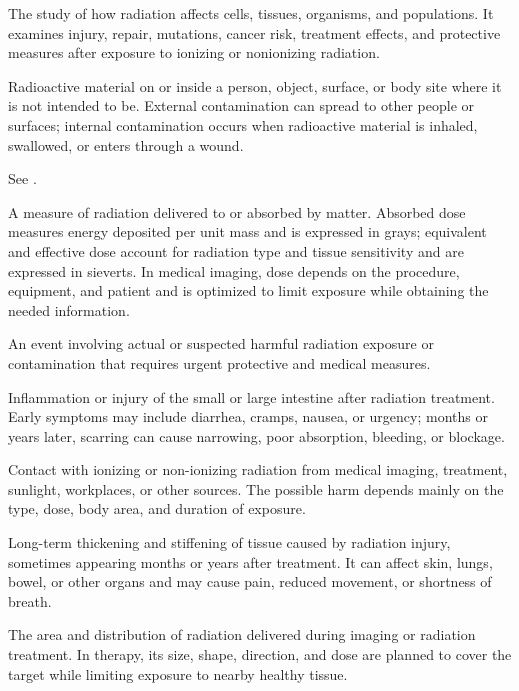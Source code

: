  The study of how radiation affects cells, tissues, organisms, and populations. It examines injury, repair, mutations, cancer risk, treatment effects, and protective measures after exposure to ionizing or nonionizing radiation.

 Radioactive material on or inside a person, object, surface, or body site where it is not intended to be. External contamination can spread to other people or surfaces; internal contamination occurs when radioactive material is inhaled, swallowed, or enters through a wound.

 See .

 A measure of radiation delivered to or absorbed by matter. Absorbed dose measures energy deposited per unit mass and is expressed in grays; equivalent and effective dose account for radiation type and tissue sensitivity and are expressed in sieverts. In medical imaging, dose depends on the procedure, equipment, and patient and is optimized to limit exposure while obtaining the needed information.

 An event involving actual or suspected harmful radiation exposure or contamination that requires urgent protective and medical
measures.

 Inflammation or injury of the small or large intestine after radiation treatment. Early symptoms may include diarrhea, cramps, nausea, or urgency; months or years later, scarring can cause narrowing, poor absorption, bleeding, or blockage.

 Contact with ionizing or non-ionizing radiation from medical imaging, treatment, sunlight, workplaces, or other sources. The possible harm depends mainly on the type, dose, body area, and duration of exposure.

 Long-term thickening and stiffening of tissue caused by radiation injury, sometimes appearing months or years after treatment. It can affect skin, lungs, bowel, or other organs and may cause pain, reduced movement, or shortness of breath.

 The area and distribution of radiation delivered during imaging or radiation treatment. In therapy, its size, shape, direction, and dose are planned to cover the target while limiting exposure to nearby healthy tissue.


